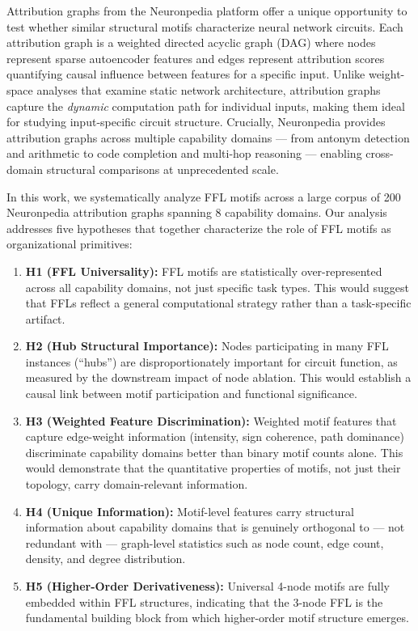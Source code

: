 Attribution graphs from the Neuronpedia platform \cite{neuronpedia2024} offer a unique opportunity to test whether similar structural motifs characterize neural network circuits. Each attribution graph is a weighted directed acyclic graph (DAG) where nodes represent sparse autoencoder features \cite{bricken2023monosemanticity} and edges represent attribution scores quantifying causal influence between features for a specific input. Unlike weight-space analyses that examine static network architecture, attribution graphs capture the \emph{dynamic} computation path for individual inputs, making them ideal for studying input-specific circuit structure. Crucially, Neuronpedia provides attribution graphs across multiple capability domains --- from antonym detection and arithmetic to code completion and multi-hop reasoning --- enabling cross-domain structural comparisons at unprecedented scale.

In this work, we systematically analyze FFL motifs across a large corpus of 200 Neuronpedia attribution graphs spanning 8 capability domains. Our analysis addresses five hypotheses that together characterize the role of FFL motifs as organizational primitives:

\begin{enumerate}
\item \textbf{H1 (FFL Universality):} FFL motifs are statistically over-represented across all capability domains, not just specific task types. This would suggest that FFLs reflect a general computational strategy rather than a task-specific artifact.
\item \textbf{H2 (Hub Structural Importance):} Nodes participating in many FFL instances (``hubs'') are disproportionately important for circuit function, as measured by the downstream impact of node ablation. This would establish a causal link between motif participation and functional significance.
\item \textbf{H3 (Weighted Feature Discrimination):} Weighted motif features that capture edge-weight information (intensity, sign coherence, path dominance) discriminate capability domains better than binary motif counts alone. This would demonstrate that the quantitative properties of motifs, not just their topology, carry domain-relevant information.
\item \textbf{H4 (Unique Information):} Motif-level features carry structural information about capability domains that is genuinely orthogonal to --- not redundant with --- graph-level statistics such as node count, edge count, density, and degree distribution.
\item \textbf{H5 (Higher-Order Derivativeness):} Universal 4-node motifs are fully embedded within FFL structures, indicating that the 3-node FFL is the fundamental building block from which higher-order motif structure emerges.
\end{enumerate}


